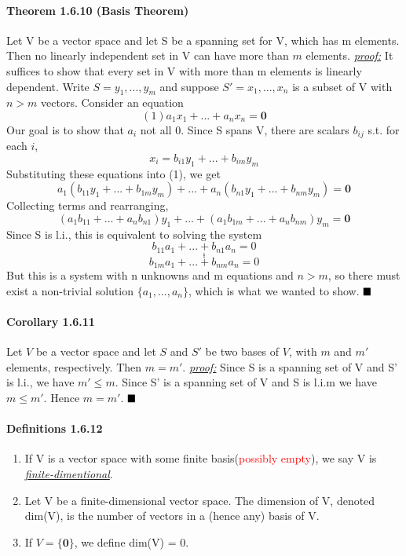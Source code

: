 \documentclass[11pt]{article}
\newcommand{\ti}[1]{\textit{#1}}
\newcommand{\tb}[1]{\textbf{#1}}
\newcommand{\under}[1]{\underline{#1}}
\newcommand{\proof}[0]{\textit{\underline{proof:} }}
\newcommand{\qed}[0]{$\hfill\blacksquare$}
\begin{document}
	\paragraph{Theorem 1.6.10 (Basis Theorem)} Let V be a vector space and let S be a spanning set for V, which has m elements. Then no linearly independent set in V can have more than $m$ elements.\newline \newline
	\ti{\under{proof:}} It suffices to show that every set in V with more than m elements is linearly dependent. Write $S = {y_1, ..., y_m}$ and suppose $S' = {x_1, ..., x_n}$ is a subset of V with $n >m$ vectors. Consider an equation
	$$(1)a_1x_1 + ... + a_nx_n = \tb{0}$$
	Our goal is to show that $a_i$ not all 0.
	Since S spans V, there are scalars $b_{ij}$ s.t. for each $i$,
	$$x_i = b_{i1}y_1 + ... +b_{im}y_m$$
	Substituting these equations into (1), we get $$a_1(b_{11}y_1+...+b_{1m}y_m)+...+a_n(b_{n1}y_1+...+b_{nm}y_m)=\tb{0}$$
	Collecting terms and rearranging,
	$$(a_1b_{11}+...+a_nb_{n1})y_1+...+(a_1b_{1m}+...+a_nb_{nm})y_m = \tb{0}$$
	Since S is l.i., this is equivalent to solving the system
	$$b_{11}a_1+...+b_{n1}a_n = 0$$
	$$.$$
	$$.$$
	$$.$$
	$$b_{1m}a_1+...+b_{nm}a_n=0$$
	But this is a system with n unknowns and m equations and $n>m$, so there must exist a non-trivial solution $\{a_1,...,a_n\}$, which is what we wanted to show. \qed
	\paragraph{Corollary 1.6.11} Let $V$ be a vector space and let $S$ and $S'$ be two bases of $V$, with $m$ and $m'$ elements, respectively. Then $m = m'$.\newline \newline
	\proof\newline
	Since S is a spanning set of V and S' is l.i., we have $m'\leq m$. Since S' is a spanning set of V and S is l.i.m we have $m \leq m'$. Hence $m = m'$. \qed
	\paragraph{Definitions 1.6.12}
	\begin{enumerate}
		\item If V is a vector space with some finite basis(\textcolor{red}{possibly empty}), we say V is \under{\it{finite-dimentional}}.
		\item Let V be a finite-dimensional vector space. The dimension of V, denoted dim(V), is the number of vectors in a (hence any) basis of V.
		\item If $V = \{\tb{0}\}$, we define dim(V) = 0.
	\end{enumerate}
\end{document}
